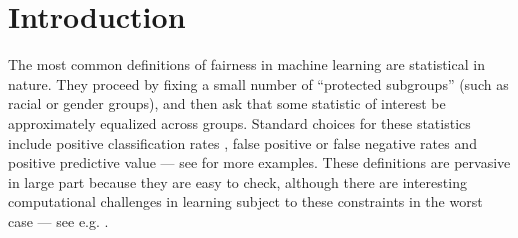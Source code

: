 \section{Introduction}

The most common definitions of fairness in machine learning are statistical in nature. 
They proceed by fixing a small number of ``protected subgroups'' (such as racial or gender groups), and then ask that some statistic of interest be approximately equalized across groups. Standard choices for these statistics include positive classification rates \citep{CV10}, false positive or false negative rates \citep{HPS16,KMR16,Chou16} and positive predictive value \citep{Chou16,KMR16} --- see \cite{Berksurvey} for more examples. These definitions are pervasive in large part because they are easy to check, although there are interesting computational challenges in learning subject to these constraints in the worst case --- see e.g. \cite{hardnesspaper}.




